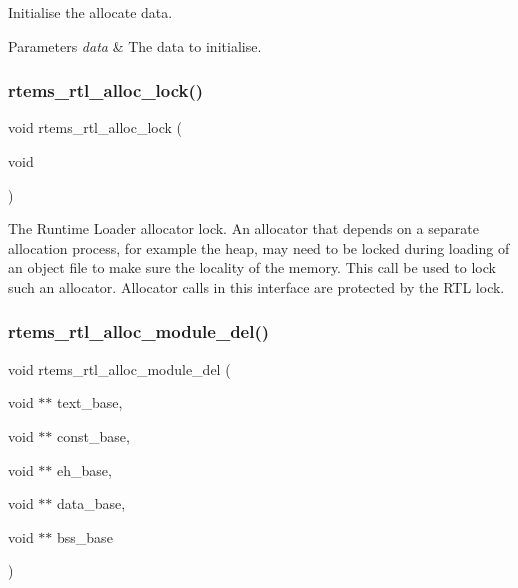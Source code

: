 Initialise the allocate data.


\begin{DoxyParams}{Parameters}
{\em data} & The data to initialise. \\
\hline
\end{DoxyParams}
\mbox{\label{rtl-allocator_8h_aca4dbc8b7c392bb60b9aa241f23773e5}} 
\subsubsection{\texorpdfstring{rtems\_rtl\_alloc\_lock()}{rtems\_rtl\_alloc\_lock()}}
{\footnotesize\ttfamily void rtems\+\_\+rtl\+\_\+alloc\+\_\+lock (\begin{DoxyParamCaption}\item[{void}]{ }\end{DoxyParamCaption})}

The Runtime Loader allocator lock. An allocator that depends on a separate allocation process, for example the heap, may need to be locked during loading of an object file to make sure the locality of the memory. This call be used to lock such an allocator. Allocator calls in this interface are protected by the R\+TL lock. \mbox{\label{rtl-allocator_8h_a718eab4a84e05b311c40633cd0f793e5}} 
\subsubsection{\texorpdfstring{rtems\_rtl\_alloc\_module\_del()}{rtems\_rtl\_alloc\_module\_del()}}
{\footnotesize\ttfamily void rtems\+\_\+rtl\+\_\+alloc\+\_\+module\+\_\+del (\begin{DoxyParamCaption}\item[{void $\ast$$\ast$}]{text\+\_\+base,  }\item[{void $\ast$$\ast$}]{const\+\_\+base,  }\item[{void $\ast$$\ast$}]{eh\+\_\+base,  }\item[{void $\ast$$\ast$}]{data\+\_\+base,  }\item[{void $\ast$$\ast$}]{bss\+\_\+base }\end{DoxyParamCaption})}

